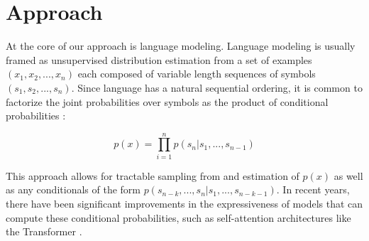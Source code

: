 \documentclass{article}
\begin{document}
\section{Approach}


At the core of our approach is language modeling. Language modeling is usually framed as unsupervised distribution estimation from a set of examples $(x_1, x_2, ..., x_n)$ each composed of variable length sequences of symbols $(s_1, s_2, ..., s_n)$. Since language has a natural sequential ordering, it is common to factorize the joint probabilities over symbols as the product of conditional probabilities \cite{jelinek1980interpolated} \cite{bengio2003neural}:

\begin{equation}
p(x) = \prod_{i=1}^{n} p(s_n|s_1,..., s_{n-1})
\end{equation}

This approach allows for tractable sampling from and estimation of $p(x)$ as well as any conditionals of the form $p(s_{n-k},...,s_{n} | s_1,...,s_{n-k-1})$. In recent years, there have been significant improvements in the expressiveness of models that can compute these conditional probabilities, such as self-attention architectures like the Transformer \cite{vaswani2017attention}.

\end{document}
